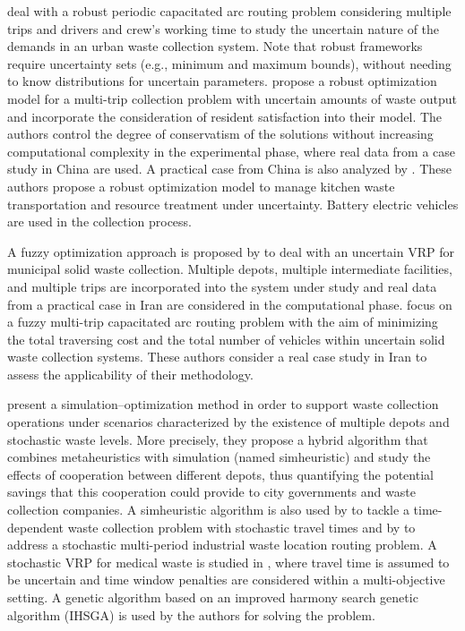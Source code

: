 \documentclass[preprint,11pt,authoryear]{elsarticle}
\begin{document}
\cite{Tirkolaee2018} deal with a robust periodic capacitated arc routing problem considering multiple trips and drivers and crew’s working time to study the uncertain nature of the demands in an urban waste
collection system. Note that robust frameworks require uncertainty sets (e.g., minimum and maximum bounds), without needing to know distributions for uncertain parameters. \cite{Zhang2022} propose a robust optimization model for a multi-trip collection problem with
uncertain amounts of waste output and incorporate the consideration of resident satisfaction into their model. The authors control the degree of conservatism of the solutions without increasing computational complexity in the experimental phase, where real data from a case study in China are used.  A practical case from China is also analyzed by \cite{Shi2024}. These authors propose a robust optimization model to manage kitchen waste transportation and resource treatment under uncertainty. Battery electric vehicles are used in the collection process.

A fuzzy optimization approach is proposed by \cite{Aliahmadi2020} to deal with an uncertain VRP for municipal solid waste collection. Multiple depots, multiple intermediate facilities, and multiple trips are incorporated into the system under study and real data from a practical case in Iran are considered in the computational phase. \cite{Tirkolaee2020} focus on a fuzzy multi-trip capacitated arc routing problem with the aim of minimizing the total traversing cost and the total number of vehicles within uncertain solid waste collection systems. These authors consider a real case study in Iran to assess the applicability of their methodology.

\cite{Gruler2017} present a simulation–optimization method in order to support waste collection operations under scenarios characterized by the existence of multiple depots and stochastic waste levels. More precisely, they propose a hybrid algorithm that combines metaheuristics with simulation (named simheuristic) and study the effects of cooperation between different depots, thus quantifying the potential savings that this cooperation could provide to city governments and waste collection companies. A simheuristic algorithm is also used by \cite{Gruler2020} to tackle a time-dependent
waste collection problem with stochastic travel times and by \cite{Rabbani2019} to address a stochastic multi-period industrial waste location routing problem. A stochastic VRP for medical waste is studied in \cite{Xu2025}, where travel time is assumed to be uncertain and time window penalties are considered within a multi-objective setting. A genetic algorithm based on an improved harmony search genetic algorithm (IHSGA) is used by the authors for solving the problem.
\end{document}
